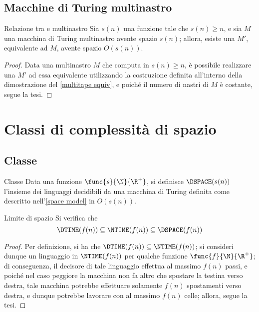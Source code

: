 \documentclass[a4paper, 12pt]{report}
\begin{document}
    \subsection{Macchine di Turing multinastro}
    
    \begin{framedthm}[label={multitape tm space equiv}]{Relazione tra \TM e \TM multinastro}
        Sia $s(n)$ una funzione tale che $s(n) \ge n$, e sia $M$ una macchina di Turing multinastro avente spazio $s(n)$; allora, esiste una \TM $M'$, equivalente ad $M$, avente spazio $O(s(n))$.
    \end{framedthm}

    \begin{proof}
        Data una \TM multinastro $M$ che computa in $s(n) \ge n$, è possibile realizzare una \TM $M'$ ad essa equivalente utilizzando la costruzione definita all'interno della dimostrazione del \cref{multitape equiv}, e poiché il numero di nastri di $M$ è costante, segue la tesi.
    \end{proof}

    \section{Classi di complessità di spazio}

    \subsection{Classe \DSPACE}

    \begin{frameddefn}{Classe \DSPACE}
        Data una funzione $\func{s}{\N}{\R^+}$, si definisce  $\DSPACE(s(n))$ l'insieme dei linguaggi decidibili da una macchina di Turing definita come descritto nell'\cref{space model} in $O(s(n))$.
    \end{frameddefn}

    \begin{framedthm}[label={dtime in dspace}]{Limite di spazio}
        Si verifica che $$\DTIME(f(n)) \subseteq \NTIME(f(n)) \subseteq \DSPACE(f(n))$$
    \end{framedthm}

    \begin{proof}
        Per definizione, si ha che $\DTIME(f(n)) \subseteq \NTIME(f(n))$; si consideri dunque un linguaggio in $\NTIME(f(n))$ per qualche funzione $\func{f}{\N}{\R^+}$; di conseguenza, il decisore di tale linguaggio effettua al massimo $f(n)$ passi, e poiché nel caso peggiore la macchina non fa altro che spostare la testina verso destra, tale macchina potrebbe effettuare solamente $f(n)$ spostamenti verso destra, e dunque potrebbe lavorare con al massimo $f(n)$ celle; allora, segue la tesi.
    \end{proof}
\end{document}
